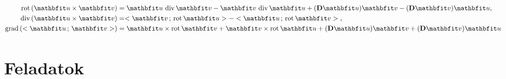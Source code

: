 \documentclass[lang=magyar]{math-handout}
\begin{document}
\begin{identities}
\begin{itemize}
\begin{align*}
            \\
            \rot \left( \rvec u \times \rvec v \right)
             & =
            \rvec u \, \Div \rvec v - \rvec v \, \Div \rvec u
            + (\Diff \rvec u) \rvec v - (\Diff \rvec v) \rvec u
            \text,
            \\
            \Div \left( \rvec u \times \rvec v \right)
             & =
            \scalar{\rvec v}{\rot \rvec u} - \scalar{\rvec u}{\rot \rvec v}
            \text,
            \\
            \grad \left( \scalar{\rvec u}{\rvec v} \right)
             & =
            \rvec u \times \rot \rvec v + \rvec v \times \rot \rvec u
            + (\Diff \rvec u) \rvec v + (\Diff \rvec v) \rvec u
          \end{align*}
  \end{itemize}
\end{identities}

\section{Feladatok}
\end{document}
